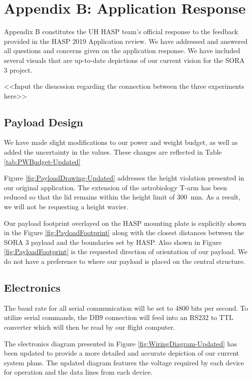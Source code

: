 \newpage
\section{Appendix B: Application Response}
\label{sec:Appendix B}

Appendix B constitutes the UH HASP team's official response to the feedback provided in the HASP 2019 Application review. We have addressed and answered all questions and concerns given on the application response. We have included several visuals that are up-to-date depictions of our current vision for the SORA 3 project.

<<Input the disucssion regarding the connection between the three experiments here>>

\subsection{Payload Design}

We have made slight modifications to our power and weight budget, as well as added the uncertainty in the values. These changes are reflected in Table \ref{tab:PWBudget-Updated}

Figure \ref{fig:PayloadDrawing-Updated} addresses the height violation presented in our original application.
The extension of the astrobiology T-arm has been reduced so that the lid remains within the height limit of \SI{300}{\milli\meter}.
As a result, we will not be requesting a height wavier.

Our payload footprint overlayed on the HASP mounting plate is explicitly shown in the Figure \ref{fig:PayloadFootprint} along with the closest distances between the SORA 3 payload and the boundaries set by HASP.
Also shown in Figure \ref{fig:PayloadFootprint} is the requested direction of orientation of our payload.
We do not have a preference to where our payload is placed on the central structure.

\subsection{Electronics}

The baud rate for all serial communication will be set to 4800 bits per second. To utilize serial commands, the DB9 connection will feed into an RS232 to TTL converter which will then be read by our flight computer.

The electronics diagram presented in Figure \ref{fig:WiringDiagram-Updated}  has been updated to provide a more detailed and accurate depiction of our current system plans.
The updated diagram features the voltage required by each device for operation and the data lines from each device.

